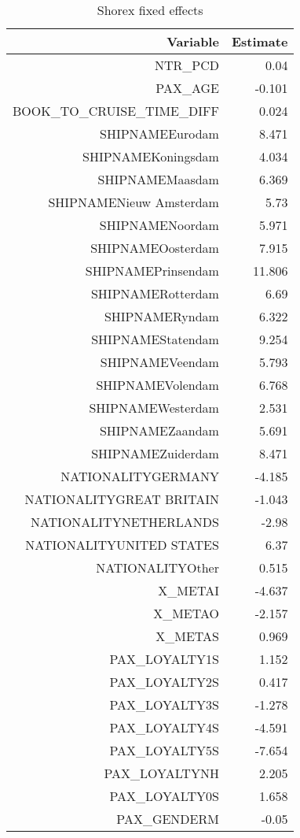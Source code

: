 \documentclass{article}
\begin{document}
\begin{table}[H]
	\centering 
	\begin{tabular}{rr}
		Variable & Estimate \\
		\hline 
		\hline 
		NTR\_PCD                   & 	0.04    \\ 
		PAX\_AGE	                  &      -0.101 \\  
		BOOK\_TO\_CRUISE\_TIME\_DIFF  &      0.024  \\ 
		SHIPNAMEEurodam	          &      8.471  \\ 
		SHIPNAMEKoningsdam	  &      4.034  \\ 
		SHIPNAMEMaasdam	          &      6.369  \\ 
		SHIPNAMENieuw Amsterdam	  &      5.73   \\
		SHIPNAMENoordam	          &      5.971  \\ 
		SHIPNAMEOosterdam         &    	7.915   \\
		SHIPNAMEPrinsendam	  &      11.806 \\  
		SHIPNAMERotterdam         &      6.69   \\
		SHIPNAMERyndam	          &      6.322  \\ 
		SHIPNAMEStatendam	  &      9.254  \\ 
		SHIPNAMEVeendam	          &      5.793  \\ 
		SHIPNAMEVolendam	  &      6.768  \\ 
		SHIPNAMEWesterdam	  &      2.531  \\ 
		SHIPNAMEZaandam	          &      5.691  \\ 
		SHIPNAMEZuiderdam	  &       8.471 \\  
		NATIONALITYGERMANY        &      -4.185 \\  
		NATIONALITYGREAT BRITAIN  &      -1.043 \\  
		NATIONALITYNETHERLANDS	  &     -2.98   \\   
		NATIONALITYUNITED STATES  &      6.37   \\   
		NATIONALITYOther          &      0.515  \\   
		X\_METAI	                  &     -4.637  \\    
		X\_METAO	                  &     -2.157  \\  
		X\_METAS	                  &     0.969   \\  
		PAX\_LOYALTY1S             &      1.152  \\  
		PAX\_LOYALTY2S             &      0.417  \\  
		PAX\_LOYALTY3S    	  &     -1.278  \\  
		PAX\_LOYALTY4S    	  &     -4.591  \\    
		PAX\_LOYALTY5S             &      -7.654 \\   
		PAX\_LOYALTYNH             &      2.205  \\    
		PAX\_LOYALTY0S	          &      1.658  \\  
		PAX\_GENDERM	          &      -0.05  \\  
		\hline 
		\hline 
	\end{tabular}
	\caption{Shorex fixed effects}
\end{table}
\end{document}
